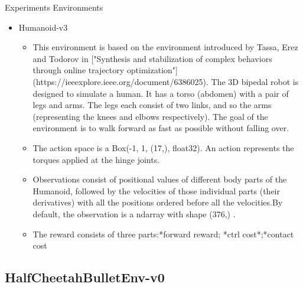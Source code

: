 \documentclass[english, xcolor=dvipsnames, aspectratio=169]{beamer}
\begin{document}
\begin{frame}{Experiments Environments}
\begin{itemize}
    \item Humanoid-v3
    \begin{itemize}
    \item This environment is based on the environment introduced by Tassa, Erez and Todorov
    in ["Synthesis and stabilization of complex behaviors through online trajectory optimization"](https://ieeexplore.ieee.org/document/6386025).
    The 3D bipedal robot is designed to simulate a human. It has a torso (abdomen) with a pair of
    legs and arms. The legs each consist of two links, and so the arms (representing the knees and
    elbows respectively). The goal of the environment is to walk forward as fast as possible without falling over.

        \item   The action space is a Box(-1, 1, (17,), float32). An action represents the torques applied at the hinge joints.
        \item    Observations consist of positional values of different body parts of the Humanoid,
     followed by the velocities of those individual parts (their derivatives) with all the
     positions ordered before all the velocities.By default, the observation is a ndarray with shape (376,) .
    \item The reward consists of three parts:*forward reward; *ctrl cost*;*contact cost 
    \end{itemize}
    
\end{itemize}
\end{frame}




\subsection{HalfCheetahBulletEnv-v0}
\end{document}
